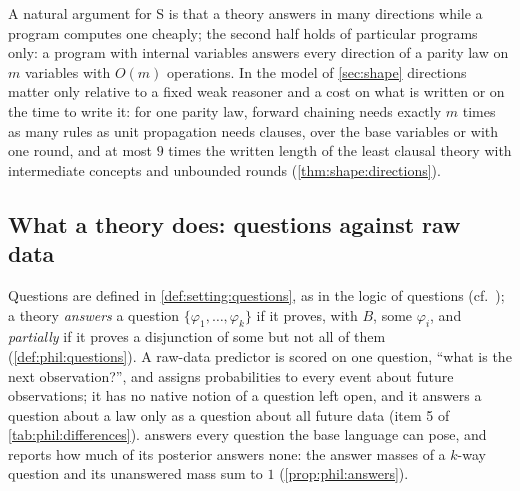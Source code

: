 A natural argument for S is that a theory answers in many directions while a program computes one cheaply; the second half holds of particular programs only: a program with internal variables answers every direction of a parity law on $m$ variables with $O(m)$ operations. In the model of \cref{sec:shape} directions matter only relative to a fixed weak reasoner and a cost on what is written or on the time to write it: for one parity law, forward chaining needs exactly $m$ times as many rules as unit propagation needs clauses, over the base variables or with one round, and at most $9$ times the written length of the least clausal theory with intermediate concepts and unbounded rounds (\cref{thm:shape:directions}).

\subsection{What a theory does: questions against raw data}\label{sec:phil:questions}

Questions are defined in \cref{def:setting:questions}, as in the logic of questions (cf.\ \citealp{belnap1976logic,hintikka1999inquiry}); a theory \emph{answers} a question $\{\varphi_1,\dots,\varphi_k\}$ if it proves, with $B$, some $\varphi_i$, and \emph{partially} if it proves a disjunction of some but not all of them (\cref{def:phil:questions}). A raw-data predictor is scored on one question, ``what is the next observation?'', and assigns probabilities to every event about future observations; it has no native notion of a question left open, and it answers a question about a law only as a question about all future data (item 5 of \cref{tab:phil:differences}). \SAIabbr answers every question the base language can pose, and reports how much of its posterior answers none: the answer masses of a $k$-way question and its unanswered mass sum to $1$ (\cref{prop:phil:answers}).

